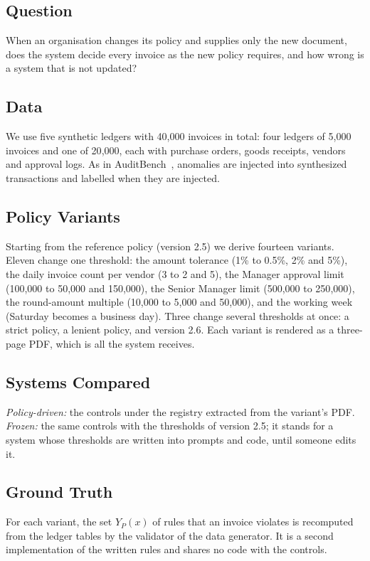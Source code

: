 \documentclass[conference]{IEEEtran}
\begin{document}
\subsection{Question}
When an organisation changes its policy and supplies only the new document, does the system decide every invoice as the new policy requires, and how wrong is a system that is not updated?

\subsection{Data}
We use five synthetic ledgers with 40{,}000 invoices in total: four ledgers of 5{,}000 invoices and one of 20{,}000, each with purchase orders, goods receipts, vendors and approval logs. As in AuditBench~\cite{wang2025auditbench}, anomalies are injected into synthesized transactions and labelled when they are injected.

\subsection{Policy Variants}
Starting from the reference policy (version 2.5) we derive fourteen variants. Eleven change one threshold: the amount tolerance (1\% to 0.5\%, 2\% and 5\%), the daily invoice count per vendor (3 to 2 and 5), the Manager approval limit (100{,}000 to 50{,}000 and 150{,}000), the Senior Manager limit (500{,}000 to 250{,}000), the round-amount multiple (10{,}000 to 5{,}000 and 50{,}000), and the working week (Saturday becomes a business day). Three change several thresholds at once: a strict policy, a lenient policy, and version 2.6. Each variant is rendered as a three-page PDF, which is all the system receives.

\subsection{Systems Compared}
\textit{Policy-driven:} the controls under the registry extracted from the variant's PDF. \textit{Frozen:} the same controls with the thresholds of version 2.5; it stands for a system whose thresholds are written into prompts and code, until someone edits it.

\subsection{Ground Truth}
For each variant, the set $Y_P(x)$ of rules that an invoice violates is recomputed from the ledger tables by the validator of the data generator. It is a second implementation of the written rules and shares no code with the controls.
\end{document}
